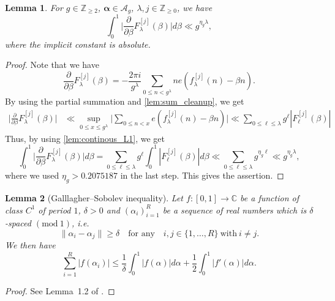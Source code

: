 \documentclass[hidelinks]{amsart}
\numberwithin{equation}{section}
\theoremstyle{plain}
\newtheorem{lemma}{Lemma}
\theoremstyle{definition}
\renewcommand{\mod}[1]{(\mathrm{mod}\ #1)}
\begin{document}
\begin{lemma}
\label{lem:continous_L1_deriv}
For $g\in\mathbb{Z}_{\ge2}$, $\bm{\alpha}\in\mathscr{A}_{g}$, $\lambda,j\in\mathbb{Z}_{\ge0}$, we have
\[
\int_{0}^{1}
\biggl|\frac{\partial}{\partial\beta}F_{\lambda}^{[j]}(\beta)\biggr|d\beta
\ll
g^{\eta_{g}\lambda},
\]
where the implicit constant is absolute.
\end{lemma}
\begin{proof}
Note that we have
\[
\frac{\partial}{\partial\beta}F_{\lambda}^{[j]}(\beta)
=
-\frac{2\pi i}{g^{\lambda}}
\sum_{0\le n<g^{\lambda}}
ne(f_{\lambda}^{[j]}(n)-\beta n).
\]
By using the partial summation and \cref{lem:sum_cleanup}, we get
\begin{align}
\biggl|\frac{\partial}{\partial\beta}F_{\lambda}^{[j]}(\beta)\biggr|
&\ll
\sup_{0\le x\le g^{\lambda}}
\biggl|
\sum_{0\le n<x}
e(f_{\lambda}^{[j]}(n)-\beta n)
\biggr|
\ll
\sum_{0\le\ell\le\lambda}
g^{\ell}|F_{\ell}^{[j]}(\beta)|
\end{align}
Thus, by using \cref{lem:continous_L1}, we get
\[
\int_{0}^{1}
\biggl|\frac{\partial}{\partial\beta}F_{\lambda}^{[j]}(\beta)\biggr|d\beta
=
\sum_{0\le\ell\le\lambda}
g^{\ell}
\int_{0}^{1}
|F_{\ell}^{[j]}(\beta)|
d\beta
\ll
\sum_{0\le\ell\le\lambda}
g^{\eta_{g}\ell}
\ll
g^{\eta_{g}\lambda},
\]
where we used $\eta_{g}>0.2075187$ in the last step.
This gives the assertion.
\end{proof}

\begin{lemma}[Galllagher--Sobolev inequality]
\label{lem:Gallagher_Sobolev}
Let $f\colon[0,1]\to\mathbb{C}$ be a function of class $C^{1}$ of period $1$,
$\delta>0$ and $(\alpha_{i})_{i=1}^{R}$ be a sequence of real numbers
which is $\delta$-spaced $\mod{1}$, i.e.\ 
\[
\|\alpha_{i}-\alpha_{j}\|\ge\delta
\quad\text{for any}\quad
i,j\in\{1,\ldots,R\}
\ \text{with}\ 
i\neq j.
\]
We then have
\[
\sum_{i=1}^{R}|f(\alpha_{i})|
\le
\frac{1}{\delta}\int_{0}^{1}|f(\alpha)|d\alpha
+
\frac{1}{2}
\int_{0}^{1}|f'(\alpha)|d\alpha.
\]
\end{lemma}
\begin{proof}
See Lemma~1.2 of \cite[p.~2]{Montgomery:Topics}.
\end{proof}
\end{document}
